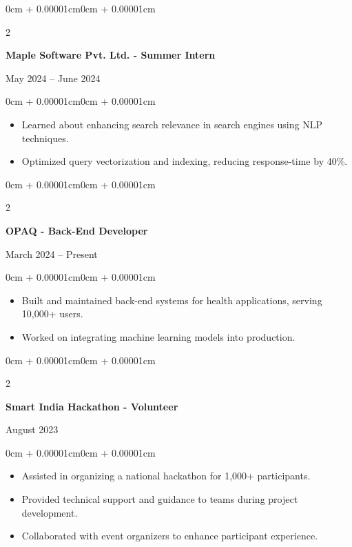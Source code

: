 \documentclass[10pt,letterpaper]{article}
\newenvironment{highlights}{
    \begin{itemize}[
        topsep=0.05cm,
        parsep=0.05cm,
        partopsep=0pt,
        itemsep=0pt,
        leftmargin=8pt
    ]
}{
    \end{itemize}
}
\newenvironment{onecolentry}{
    \begin{adjustwidth}{0cm + 0.00001cm}{0cm + 0.00001cm}
}{
    \end{adjustwidth}
}
\newenvironment{twocolentry}[2][]{
    \onecolentry
    \def\secondColumn{#2}
    \setcolumnwidth{\fill, 4.0cm}
    \begin{paracol}{2}
}{
    \switchcolumn \raggedleft \secondColumn
    \end{paracol}
    \endonecolentry
}
\begin{document}
    \begin{twocolentry}{May 2024 – June 2024}
        \textbf{Maple Software Pvt. Ltd. - Summer Intern} 
    \end{twocolentry}
    \begin{onecolentry}
        \begin{highlights}
            \item Learned about enhancing search relevance in search engines using NLP techniques.
            \item Optimized query vectorization and indexing, reducing response-time by 40\%.
        \end{highlights}
    \end{onecolentry}

    \begin{twocolentry}{March 2024 – Present}
        \textbf{OPAQ - Back-End Developer} 
    \end{twocolentry}
    \begin{onecolentry}
        \begin{highlights}
            \item Built and maintained back-end systems for health applications, serving 10,000+ users.
            \item Worked on integrating machine learning models into production.
        \end{highlights}
    \end{onecolentry}

    \begin{twocolentry}{August 2023}
        \textbf{Smart India Hackathon - Volunteer} 
    \end{twocolentry}
    \begin{onecolentry}
        \begin{highlights}
            \item Assisted in organizing a national hackathon for 1,000+ participants.
            \item Provided technical support and guidance to teams during project development.
            \item Collaborated with event organizers to enhance participant experience.
        \end{highlights}
    \end{onecolentry}
\end{document}
